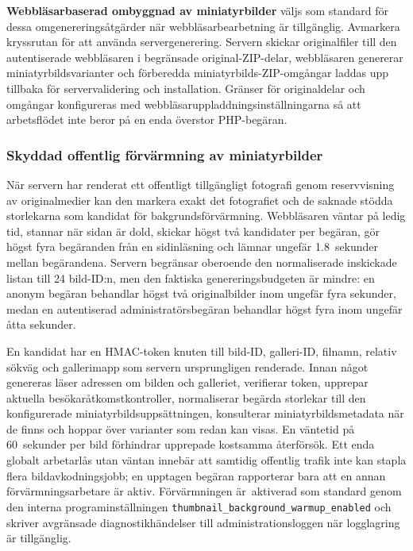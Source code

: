 \documentclass[11pt,a4paper]{article}
\newcommand{\setting}[1]{\nolinkurl{#1}}
\newcommand{\ui}[1]{\textbf{#1}}
\begin{document}
\ui{Webbläsarbaserad ombyggnad av miniatyrbilder} väljs som standard för dessa
omgenereringsåtgärder när webbläsarbearbetning är tillgänglig. Avmarkera
kryssrutan för att använda servergenerering. Servern skickar originalfiler
till den autentiserade webbläsaren i begränsade original-ZIP-delar,
webbläsaren genererar miniatyrbildsvarianter och förberedda
miniatyrbilds-ZIP-omgångar laddas upp tillbaka för servervalidering och
installation. Gränser för originaldelar och omgångar konfigureras med
webbläsaruppladdningsinställningarna så att arbetsflödet inte beror på en enda
överstor PHP-begäran.

\subsubsection{Skyddad offentlig förvärmning av miniatyrbilder}

När servern har renderat ett offentligt tillgängligt fotografi genom
reservvisning av originalmedier kan den markera exakt det fotografiet och de
saknade stödda storlekarna som kandidat för bakgrundsförvärmning. Webbläsaren
väntar på ledig tid, stannar när sidan är dold, skickar högst två kandidater per
begäran, gör högst fyra begäranden från en sidinläsning och lämnar ungefär
1.8~sekunder mellan begärandena. Servern begränsar oberoende den normaliserade
inskickade listan till 24 bild-ID:n, men den faktiska genereringsbudgeten är
mindre: en anonym begäran behandlar högst två originalbilder inom ungefär fyra
sekunder, medan en autentiserad administratörsbegäran behandlar högst fyra inom
ungefär åtta sekunder.

En kandidat har en HMAC-token knuten till bild-ID, galleri-ID, filnamn, relativ
sökväg och gallerimapp som servern ursprungligen renderade. Innan något
genereras läser adressen om bilden och galleriet, verifierar token, upprepar
aktuella besökaråtkomstkontroller, normaliserar begärda storlekar till den
konfigurerade miniatyrbildsuppsättningen, konsulterar miniatyrbildsmetadata när
de finns och hoppar över varianter som redan kan visas. En väntetid på
60~sekunder per bild förhindrar upprepade kostsamma återförsök. Ett enda globalt
arbetarlås utan väntan innebär att samtidig offentlig trafik inte kan stapla
flera bildavkodningsjobb; en upptagen begäran rapporterar bara att en annan
förvärmningsarbetare är aktiv. Förvärmningen är~aktiverad som standard genom den
interna programinställningen \setting{thumbnail_background_warmup_enabled} och
skriver avgränsade diagnostikhändelser till administrationsloggen när
logglagring är tillgänglig.
\end{document}
